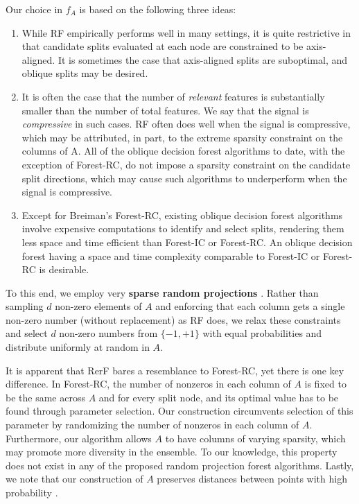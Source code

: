 \documentclass{article}
\begin{document}
Our choice in $f_A$ is based on the following three ideas:
\begin{enumerate}
  \item While RF empirically performs well in many settings, it is quite restrictive in that candidate splits evaluated at each node are constrained to be axis-aligned. It is sometimes the case that axis-aligned splits are suboptimal, and oblique splits may be desired.
  \item It is often the case that the number of \textit{relevant} features is substantially smaller than the number of total features. We say that the signal is \textit{compressive} in such cases. RF often does well when the signal is compressive, which may be attributed, in part, to the extreme sparsity constraint on the columns of A. All of the oblique decision forest algorithms to date, with the exception of Forest-RC, do not impose a sparsity constraint on the candidate split directions, which may cause such algorithms to underperform when the signal is compressive.
  \item Except for Breiman's Forest-RC, existing oblique decision forest algorithms involve expensive computations to identify and select splits, rendering them less space and time efficient than Forest-IC or Forest-RC. An oblique decision forest having a space and time complexity comparable to Forest-IC or Forest-RC is desirable.
\end{enumerate}

To this end, we employ very {\bf{sparse random projections}} \cite{Li2006}. Rather than sampling $d$ non-zero elements of $A$ and enforcing that each column gets a single non-zero number (without replacement) as RF does, we relax these constraints and select $d$ non-zero numbers from $\{-1,+1\}$ with equal probabilities and distribute uniformly at random in $A$.

It is apparent that RerF bares a resemblance to Forest-RC, yet there is one key difference. In Forest-RC, the number of nonzeros in each column of $A$ is fixed to be the same across $A$ and for every split node, and its optimal value has to be found through parameter selection. Our construction circumvents selection of this parameter by randomizing the number of nonzeros in each column of $A$. Furthermore, our algorithm allows $A$ to have columns of varying sparsity, which may promote more diversity in the ensemble. To our knowledge, this property does not exist in any of the proposed random projection forest algorithms. Lastly, we note that our construction of $A$ preserves distances between points with high probability \cite{Li2006}.
\end{document}
